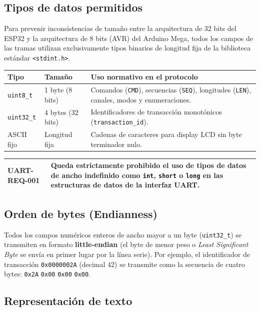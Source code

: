 \documentclass[a4paper,11pt]{article}
\newcommand{\tablehead}[1]{\cellcolor{SAIDBlue}\color{white}\textbf{#1}}
\newcommand{\requirement}[2]{%
    \par\smallskip
    \noindent\begin{tabularx}{\textwidth}{|>{\bfseries}p{3.2cm}|X|}
        \hline
        \cellcolor{SAIDLight}#1 & #2 \\
        \hline
    \end{tabularx}
    \par\smallskip
}
\begin{document}
\subsection{Tipos de datos permitidos}

Para prevenir inconsistencias de tamaño entre la arquitectura de 32 bits del
ESP32 y la arquitectura de 8 bits (AVR) del Arduino Mega, todos los campos de
las tramas utilizan exclusivamente tipos binarios de longitud fija de la
biblioteca estándar \texttt{<stdint.h>}.

\noindent\begin{tabularx}{\textwidth}{|p{2.8cm}|p{2.2cm}|X|}
    \hline
    \tablehead{Tipo} & \tablehead{Tamaño} & \tablehead{Uso normativo en el protocolo} \\
    \hline
    \texttt{uint8\_t} & 1 byte (8 bits) & Comandos (\texttt{CMD}), secuencias (\texttt{SEQ}), longitudes (\texttt{LEN}), canales, modos y enumeraciones. \\
    \hline
    \texttt{uint32\_t} & 4 bytes (32 bits) & Identificadores de transacción monotónicos (\texttt{transaction\_id}). \\
    \hline
    ASCII fijo & Longitud fija & Cadenas de caracteres para display LCD sin byte terminador nulo. \\
    \hline
\end{tabularx}

\requirement{UART-REQ-001}{Queda estrictamente prohibido el uso de tipos de datos de ancho indefinido como \texttt{int}, \texttt{short} o \texttt{long} en las estructuras de datos de la interfaz UART.}

\subsection{Orden de bytes (Endianness)}

Todos los campos numéricos enteros de ancho mayor a un byte (\texttt{uint32\_t})
se transmiten en formato \textbf{little-endian} (el byte de menor peso o \textit{Least
Significant Byte} se envía en primer lugar por la línea serie). Por ejemplo, el
identificador de transacción \texttt{0x0000002A} (decimal 42) se transmite como la
secuencia de cuatro bytes: \texttt{0x2A} \texttt{0x00} \texttt{0x00} \texttt{0x00}.

\subsection{Representación de texto}
\end{document}
